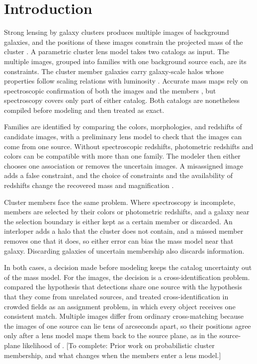 \documentclass[twocolumn,twocolappendix,linenumbers]{aastex701}
\newcommand{\todo}[1]{\textcolor{red!65!black}{[To complete: #1]}}
\begin{document}
\section{Introduction}
\label{sec:introduction}
Strong lensing by galaxy clusters produces multiple images of background galaxies, and the positions of these images constrain the projected mass of the cluster \citep{Kneib+2011,Natarajan2024}.
A parametric cluster lens model takes two catalogs as input.
The multiple images, grouped into families with one background source each, are its constraints.
The cluster member galaxies carry galaxy-scale halos whose properties follow scaling relations with luminosity \citep{Natarajan1997,Jullo2007}.
Accurate mass maps rely on spectroscopic confirmation of both the images and the members \citep{Grillo2015}, but spectroscopy covers only part of either catalog.
Both catalogs are nonetheless compiled before modeling and then treated as exact.

Families are identified by comparing the colors, morphologies, and redshifts of candidate images, with a preliminary lens model to check that the images can come from one source.
Without spectroscopic redshifts, photometric redshifts and colors can be compatible with more than one family.
The modeler then either chooses one association or removes the uncertain images.
A misassigned image adds a false constraint, and the choice of constraints and the availability of redshifts change the recovered mass and magnification \citep{Johnson2016}.

Cluster members face the same problem.
Where spectroscopy is incomplete, members are selected by their colors or photometric redshifts, and a galaxy near the selection boundary is either kept as a certain member or discarded.
An interloper adds a halo that the cluster does not contain, and a missed member removes one that it does, so either error can bias the mass model near that galaxy.
Discarding galaxies of uncertain membership also discards information.

In both cases, a decision made before modeling keeps the catalog uncertainty out of the mass model.
For the images, the decision is a cross-identification problem.
\citet{Budavari2008} compared the hypothesis that detections share one source with the hypothesis that they come from unrelated sources, and \citet{Budavari2016} treated cross-identification in crowded fields as an assignment problem, in which every object receives one consistent match.
Multiple images differ from ordinary cross-matching because the images of one source can lie tens of arcseconds apart, so their positions agree only after a lens model maps them back to the source plane, as in the source-plane likelihood of \citet{Jullo2007}.
\todo{Prior work on probabilistic cluster membership, and what changes when the members enter a lens model.}
\end{document}
